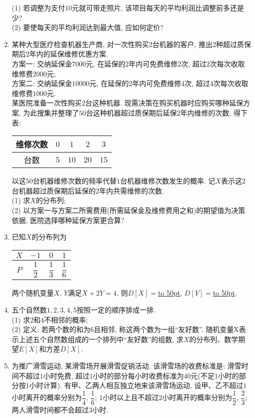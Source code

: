 \documentclass[10pt,a4paper]{article}
\newcommand{\blank}[1]{\underline{\hbox to #1pt{}}}
\begin{document}
\begin{enumerate}[1.]
(1) 若调整为支付$10$元就可带走照片, 该项目每天的平均利润比调整前多还是少?\\
(2) 要使每天的平均利润达到最大值, 应如何定价?
\item 某种大型医疗检查机器生产商, 对一次性购买$2$台机器的客户, 推出$2$种超过质保期后$2$年内的延保维修优惠方案.\\
方案一: 交纳延保金$7000$元, 在延保的$2$年内可免费维修$2$次, 超过$2$次每次收取维修费$2000$元;\\
方案二: 交纳延保金$10000$元, 在延保的$2$年内可免费维修$4$次, 超过$4$次每次收取维修费$1000$元.\\
某医院准备一次性购买$2$台这种机器. 现需决策在购买机器时应购买哪种延保方案, 为此搜集并整理了$50$台这种机器超过质保期后延保$2$年内维修的次数, 得下表:
\begin{center}
    \begin{tabular}{|c|c|c|c|c|}
        \hline
        维修次数 & $0$ & $1$ & $2$ & $3$\\ \hline
        台数 & $5$ & $10$ & $20$ & $15$\\ \hline
    \end{tabular}
\end{center}
以这$50$台机器维修次数的频率代替$1$台机器维修次数发生的概率. 记$X$表示这$2$台机器超过质保期后延保的$2$年内共需维修的次数.\\
(1) 求$X$的分布列;\\
(2) 以方案一与方案二所需费用(所需延保金及维修费用之和)的期望值为决策依据, 医院选择哪种延保方案更合算?
\item 已知$X$的分布列为
\begin{center}
    \begin{tabular}{|c|c|c|c|}
        \hline
        $X$ & $-1$ & $0$ & $1$ \\ \hline
        $P$ & $\dfrac 12$ & $\dfrac 13$ & $\dfrac 16$ \\ \hline       
    \end{tabular}
\end{center}
两个随机变量$X$, $Y$满足$X+2Y=4$, 则$D[X]=$\blank{50}, $D[Y]=$\blank{50}.
\item 五个自然数$1, 2, 3, 4, 5$按照一定的顺序排成一排.\\
(1) 求$2$和$4$不相邻的概率;\\
(2) 定义: 若两个数的和为$6$且相邻, 称这两个数为一组``友好数''. 随机变量X表示上述五个自然数组成的一个排列中``友好数''的组数, 求$X$的分布列、数学期望$E[X]$和方差$D[X]$.
\item 为推广滑雪运动, 某滑雪场开展滑雪促销活动. 该滑雪场的收费标准是: 滑雪时间不超过$1$小时免费, 超过$1$小时的部分每小时收费标准为$40$元(不足$1$小时的部分按$1$小时计算). 有甲、乙两人相互独立地来该滑雪场运动, 设甲、乙不超过$1$小时离开的概率分别为$\dfrac 14$, $\dfrac 16$; $1$小时以上且不超过$2$小时离开的概率分别为$\dfrac 12$, $\dfrac 23$; 两人滑雪时间都不会超过$3$小时.\\

\end{enumerate}
\end{document}
